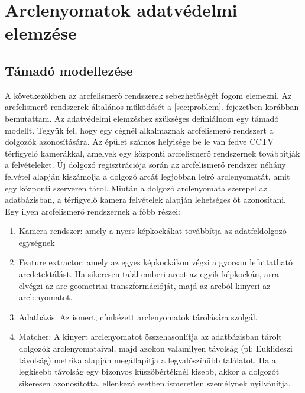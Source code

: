 \section{Arclenyomatok adatvédelmi elemzése}
\label{sec:4}

\subsection{Támadó modellezése} %

A következőkben az arcfelismerő rendszerek sebezhetőségét fogom elemezni. Az arcfelismerő rendszerek általános működését a \ref{sec:problem}. fejezetben korábban bemutattam. Az adatvédelmi elemzéshez szükséges definiálnom egy támadó modellt. Tegyük fel, hogy egy cégnél alkalmaznak arcfelismerő rendszert a dolgozók azonosítására. Az épület számos helyisége be le van fedve CCTV térfigyelő kamerákkal, amelyek egy központi arcfelismerő rendszernek továbbítják a felvételeket. Új dolgozó regisztrációja során az arcfelismerő rendszer néhány felvétel alapján kiszámolja a dolgozó arcát legjobban leíró arclenyomatát, amit egy központi szerveren tárol. Miután a dolgozó arclenyomata szerepel az adatbázisban, a térfigyelő kamera felvételek alapján lehetséges őt azonosítani. Egy ilyen arcfelismerő rendszernek a főbb részei: 

\begin{enumerate}
	\item Kamera rendszer: amely a nyers képkockákat továbbítja az adatfeldolgozó egységnek
	\item Feature extractor: amely az egyes képkockákon végzi a gyorsan lefuttatható arcdetektálást. Ha sikeresen talál emberi arcot az egyik képkockán, arra elvégzi az arc geometriai transzformációját, majd az arcból kinyeri az arclenyomatot.
	\item Adatbázis: Az ismert, címkézett arclenyomatok tárolására szolgál.
	\item Matcher: A kinyert arclenyomatot összehasonlítja az adatbázisban tárolt dolgozók arclenyomataival, majd azokon valamilyen távolság (pl: Euklideszi távolság) metrika alapján megállapítja a legvalószínűbb találatot. Ha a legkisebb távolság egy bizonyos küszöbértéknél kisebb, akkor a dolgozót sikeresen azonosította, ellenkező esetben ismeretlen személynek nyilvánítja.
\end{enumerate}

